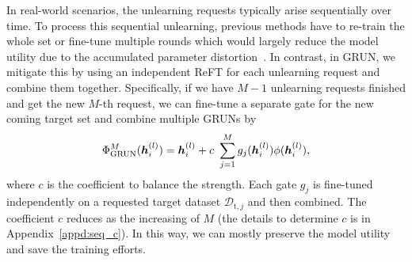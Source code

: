 
In real-world scenarios, the unlearning requests typically arise sequentially over time. To process this sequential unlearning, previous methods have to re-train the whole set or fine-tune multiple rounds which would largely reduce the model utility due to the accumulated parameter distortion~\cite{shi2024muse}. {In contrast,} in GRUN,  we mitigate this by using an independent ReFT for each unlearning request and combine them together. Specifically, if we have $M-1$ unlearning requests finished and get the new $M$-th request, we can fine-tune a separate gate for the new coming target set and combine multiple GRUNs by
\begin{align}
    \Phi_{\text{GRUN}}^{M}(\boldsymbol{h}_i^{(l)})=\boldsymbol{h}_i^{(l)}+ c ~\sum_{j=1}^{M}g_j(\boldsymbol{h}_i^{(l)}) \phi(\boldsymbol{h}_i^{(l)}), \notag
\end{align}
where $c$ is the coefficient to balance the strength. Each gate $g_j$ is fine-tuned independently on a requested target dataset $\mathcal{D}_{\mathrm{t}, j}$ and then combined. The coefficient $c$ reduces as the increasing of $M$ (the details to determine $c$ is in Appendix~\ref{appd:seq_c}). In this way, we can mostly preserve the model utility and save the training efforts. 
